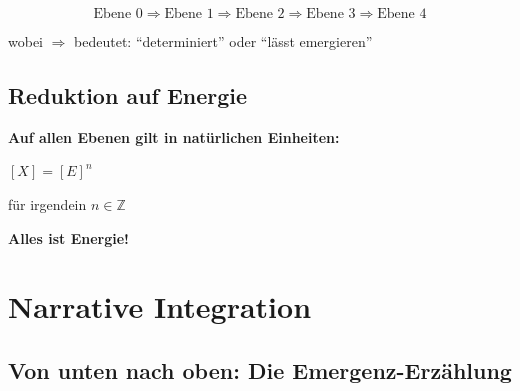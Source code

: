 \begin{equation}
\text{Ebene 0} \Rightarrow \text{Ebene 1} \Rightarrow \text{Ebene 2} \Rightarrow \text{Ebene 3} \Rightarrow \text{Ebene 4}
\end{equation}

wobei $\Rightarrow$ bedeutet: \enquote{determiniert} oder \enquote{lässt emergieren}

\subsection{Reduktion auf Energie}

\begin{center}
\textbf{Auf allen Ebenen gilt in natürlichen Einheiten:}

\vspace{0.3cm}

 $[X] = [E]^n$

\vspace{0.3cm}

\normalsize für irgendein $n \in \mathbb{Z}$
\end{center}

\textbf{Alles ist Energie!}

\section{Narrative Integration}

\subsection{Von unten nach oben: Die Emergenz-Erzählung}

